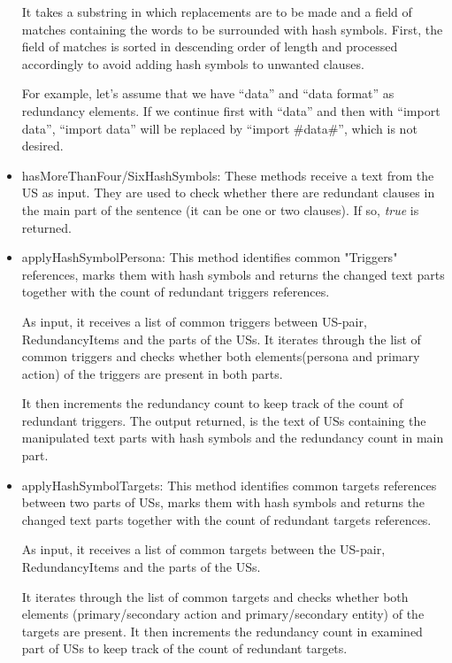 \begin{itemize}
	It takes a substring in which replacements are to be made and a field of matches containing the words to be surrounded with hash symbols. First, the field of matches is sorted in descending order of length and processed accordingly to avoid adding hash symbols to unwanted clauses. 
	\begin{example}
		For example, let's assume that we have \enquote{data} and \enquote{data format} as redundancy elements. If we continue first with \enquote{data} and then with \enquote{import data}, \enquote{import data} will be replaced by \enquote{import \#data\#}, which is not desired.
	\end{example}
	\item hasMoreThanFour/SixHashSymbols: These methods receive a text from the US as input. They are used to check whether there are redundant clauses in the main part of the sentence (it can be one or two clauses). If so, \textit{true} is returned.
	
	\item applyHashSymbolPersona: This method identifies common "Triggers" references, marks them with hash symbols and returns the changed text parts together with the count of redundant triggers references. 
	
	As input, it receives a list of common triggers between US-pair, RedundancyItems and the parts of the USs. It iterates through the list of common triggers and checks whether both elements(persona and primary action) of the triggers are present in both parts. 
	
	It then increments the redundancy count to keep track of the count of redundant triggers. The output returned, is the text of USs containing the manipulated text parts with hash symbols and the redundancy count in main part.
	
	\item applyHashSymbolTargets: This method identifies common targets references between two parts of USs, marks them with hash symbols and returns the changed text parts together with the count of redundant targets references.
	
	As input, it receives a list of common targets between the US-pair, RedundancyItems and the parts of the USs. 
	
	It iterates through the list of common targets and checks whether both elements (primary/secondary action and primary/secondary entity) of the targets are present. It then increments the redundancy count in examined part of USs to keep track of the count of redundant targets. 
	

\end{itemize}
